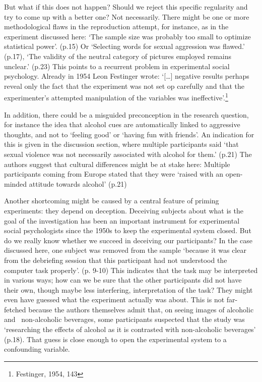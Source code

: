 \documentclass[twocolumn, serif, review, authordate]{jote-article}
\begin{document}
But what if this does not happen? Should we reject this specific regularity and try to come up with a better one? Not necessarily. There might be one or more methodological flaws in the reproduction attempt, for instance, as in the experiment discussed here: `The sample size was probably too small to optimize statistical power'. (p.15) Or `Selecting words for sexual aggression was flawed.' (p.17), `The validity of the neutral category of pictures employed remains unclear.' (p.23) This points to a recurrent problem in experimental social psychology. Already in 1954 Leon Festinger wrote: `[{\dots}] negative results perhaps reveal only the fact that the experiment was not set op carefully and that the experimenter's attempted manipulation of the variables was ineffective'.\footnote{ Festinger, 1954, 143}

In addition, there could be a misguided preconception in the research question, for instance the idea that alcohol cues are automatically linked to aggressive thoughts, and not to `feeling good' or `having fun with friends'. An indication for this is given in the discussion section, where multiple participants said `that sexual violence was not necessarily associated with alcohol for them.' (p.21) The authors suggest that cultural differences might be at stake here: Multiple participants coming from Europe stated that they were `raised with an open-minded attitude towards alcohol' (p.21)

Another shortcoming might be caused by a central feature of priming experiments: they depend on deception. Deceiving subjects about what is the goal of the investigation has been an important instrument for experimental social psychologists since the 1950s to keep the experimental system closed. But do we really know whether we succeed in deceiving our participants? In the case discussed here, one subject was removed from the sample `because it was clear from the debriefing session that this participant had not understood the computer task properly'. (p. 9-10) This indicates that the task may be interpreted in various ways; how can we be sure that the other participants did not have their own, though maybe less interfering, interpretation of the task? They might even have guessed what the experiment actually was about. This is not far-fetched because the authors themselves admit that, on seeing images of alcoholic and \ non-alcoholic beverages, some participants suspected that the study was `researching the effects of alcohol as it is contrasted with non-alcoholic beverages' (p.18). That guess is close enough to open the experimental system to a confounding variable.
\end{document}
